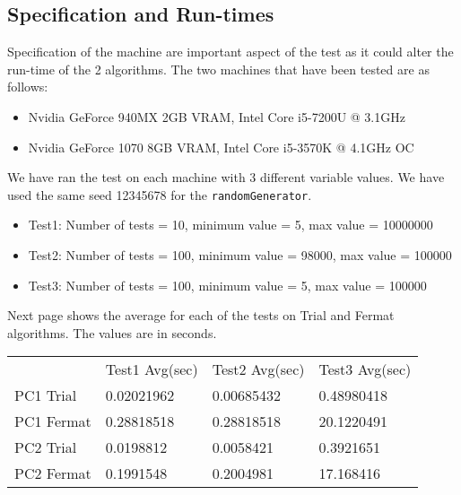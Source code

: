 \documentclass[]{article}
\begin{document}
\subsection{Specification and Run-times}
Specification of the machine are important aspect of the test as it could alter the run-time of the 2 algorithms. The two machines that have been tested are as follows:
\begin{itemize}
	\item Nvidia GeForce 940MX 2GB VRAM, Intel Core i5-7200U @ 3.1GHz
	\item Nvidia GeForce 1070 8GB VRAM, Intel Core i5-3570K @ 4.1GHz OC
\end{itemize}
We have ran the test on each machine with 3 different variable values. We have used the same seed 12345678 for the \lstinline|randomGenerator|.
\begin{itemize}
	\item Test1: Number of tests = 10, minimum value = 5, max value = 10000000
	\item Test2: Number of tests = 100, minimum value = 98000, max value = 100000
	\item Test3: Number of tests = 100, minimum value = 5, max value = 100000
\end{itemize}
Next page shows the average for each of the tests on Trial and Fermat algorithms. The values are in seconds.

\begin{table}[]
	\begin{tabular}{llll}
		& Test1 Avg(sec)  & Test2 Avg(sec)  & Test3 Avg(sec)  \\
		PC1 Trial  & 0.02021962 & 0.00685432 & 0.48980418 \\
		PC1 Fermat & 0.28818518 & 0.28818518 & 20.1220491 \\
		PC2 Trial  & 0.0198812  & 0.0058421  & 0.3921651  \\
		PC2 Fermat & 0.1991548  & 0.2004981  & 17.168416 
	\end{tabular}
\end{table}
\end{document}
